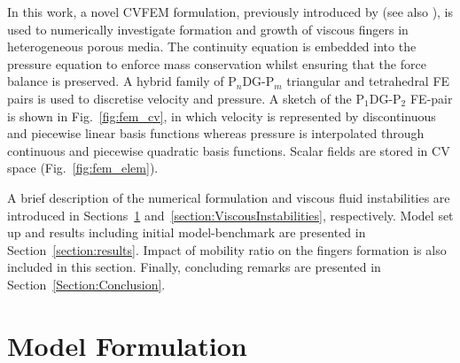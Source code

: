 \documentclass[preprint,authoryear,12pt]{elsarticle}
\newcommand{\PN}[2][error]{P$_{#1}$DG-P$_{#2}$}
\begin{document}
\medskip 
In this work, a novel CVFEM formulation, previously introduced by \citet{gomes_2017} (see also \citet{jackson_2015,salinas2015}), is used to numerically investigate formation and growth of viscous fingers in heterogeneous porous media. The continuity equation is embedded into the pressure equation to enforce mass conservation whilst ensuring that the force balance is preserved. A hybrid family of \PN[n]{m} triangular and tetrahedral FE pairs is used to discretise velocity and pressure. %
A sketch of the \PN[1]{2} FE-pair is shown in Fig.~\ref{fig:fem_cv}, in which velocity is represented by discontinuous and piecewise linear basis functions whereas pressure is interpolated through continuous and piecewise quadratic basis functions. Scalar fields are stored in CV space (Fig.~\ref{fig:fem_elem}). %
 
\medskip
A brief description of the numerical formulation and viscous fluid instabilities are introduced in Sections~\ref{equations_scheme} and~\ref{section:ViscousInstabilities}, respectively. Model set up and results including initial model-benchmark are presented in Section~\ref{section:results}. Impact of mobility ratio on the fingers formation is also included in this section. Finally, concluding remarks are presented in Section~\ref{Section:Conclusion}.

\section{Model Formulation}\label{equations_scheme}      
\end{document}
